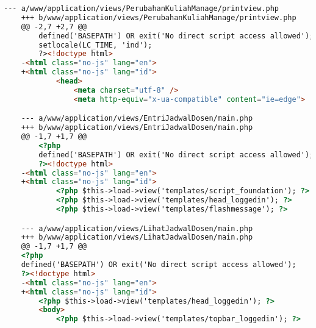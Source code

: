 \begin{lstlisting}[frame=single, label={lst:perbaikan_3.1.1_bahasa_halaman}, language=HTML, caption=Perbaikan Kriteria Sukses 3.1.1 - Bahasa yang Tidak Sesuai]
    --- a/www/application/views/PerubahanKuliahManage/printview.php
    +++ b/www/application/views/PerubahanKuliahManage/printview.php
    @@ -2,7 +2,7 @@
        defined('BASEPATH') OR exit('No direct script access allowed');
        setlocale(LC_TIME, 'ind');
        ?><!doctype html>
    -<html class="no-js" lang="en">
    +<html class="no-js" lang="id">
            <head>
                <meta charset="utf-8" />
                <meta http-equiv="x-ua-compatible" content="ie=edge">

    --- a/www/application/views/EntriJadwalDosen/main.php
    +++ b/www/application/views/EntriJadwalDosen/main.php
    @@ -1,7 +1,7 @@
        <?php
        defined('BASEPATH') OR exit('No direct script access allowed');
        ?><!doctype html>
    -<html class="no-js" lang="en">
    +<html class="no-js" lang="id">
            <?php $this->load->view('templates/script_foundation'); ?>
            <?php $this->load->view('templates/head_loggedin'); ?>
            <?php $this->load->view('templates/flashmessage'); ?>

    --- a/www/application/views/LihatJadwalDosen/main.php
    +++ b/www/application/views/LihatJadwalDosen/main.php
    @@ -1,7 +1,7 @@
    <?php
    defined('BASEPATH') OR exit('No direct script access allowed');
    ?><!doctype html>
    -<html class="no-js" lang="en">
    +<html class="no-js" lang="id">
        <?php $this->load->view('templates/head_loggedin'); ?>
        <body>
            <?php $this->load->view('templates/topbar_loggedin'); ?>
\end{lstlisting}

